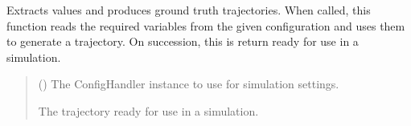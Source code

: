 \documentclass[letterpaper,10pt,english]{sphinxmanual}
\begin{document}

\begin{fulllineitems}
\label{\detokenize{modules/input/config:qnav.input.config.get_trajectory}}
\pysigstartsignatures
{}
\pysigstopsignatures
\sphinxAtStartPar
Extracts values and produces ground truth trajectories.
When called, this function reads the required variables from the
given configuration and uses them to generate a trajectory. On
succession, this is return ready for use in a simulation.
\begin{quote}\begin{description}
\sphinxAtStartPar
{} ({\hyperref[\detokenize{modules/input/config_handler:qnav.input.config_handler.ConfigHandler}]{}}) \textendash{} The ConfigHandler instance to use for simulation settings.

\sphinxAtStartPar
The trajectory ready for use in a simulation.

\sphinxAtStartPar
{\hyperref[\detokenize{modules/waypoints/trajectory:qnav.waypoints.trajectory.Trajectory}]{}}

\end{description}\end{quote}

\end{fulllineitems}

\end{document}
